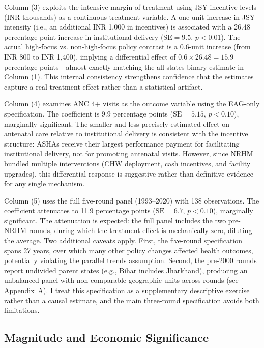 \documentclass[12pt]{article}
\begin{document}
Column (3) exploits the intensive margin of treatment using JSY incentive levels (INR thousands) as a continuous treatment variable. A one-unit increase in JSY intensity (i.e., an additional INR 1,000 in incentives) is associated with a 26.48 percentage-point increase in institutional delivery ($\text{SE} = 9.5$, $p < 0.01$). The actual high-focus vs. non-high-focus policy contrast is a 0.6-unit increase (from INR 800 to INR 1,400), implying a differential effect of $0.6 \times 26.48 = 15.9$ percentage points---almost exactly matching the all-states binary estimate in Column (1). This internal consistency strengthens confidence that the estimates capture a real treatment effect rather than a statistical artifact.

Column (4) examines ANC 4+ visits as the outcome variable using the EAG-only specification. The coefficient is 9.9 percentage points ($\text{SE} = 5.15$, $p < 0.10$), marginally significant. The smaller and less precisely estimated effect on antenatal care relative to institutional delivery is consistent with the incentive structure: ASHAs receive their largest performance payment for facilitating institutional delivery, not for promoting antenatal visits. However, since NRHM bundled multiple interventions (CHW deployment, cash incentives, and facility upgrades), this differential response is suggestive rather than definitive evidence for any single mechanism.

Column (5) uses the full five-round panel (1993--2020) with 138 observations. The coefficient attenuates to 11.9 percentage points ($\text{SE} = 6.7$, $p < 0.10$), marginally significant. The attenuation is expected: the full panel includes the two pre-NRHM rounds, during which the treatment effect is mechanically zero, diluting the average. Two additional caveats apply. First, the five-round specification spans 27 years, over which many other policy changes affected health outcomes, potentially violating the parallel trends assumption. Second, the pre-2000 rounds report undivided parent states (e.g., Bihar includes Jharkhand), producing an unbalanced panel with non-comparable geographic units across rounds (see Appendix~A). I treat this specification as a supplementary descriptive exercise rather than a causal estimate, and the main three-round specification avoids both limitations.

\subsection{Magnitude and Economic Significance}
\end{document}
